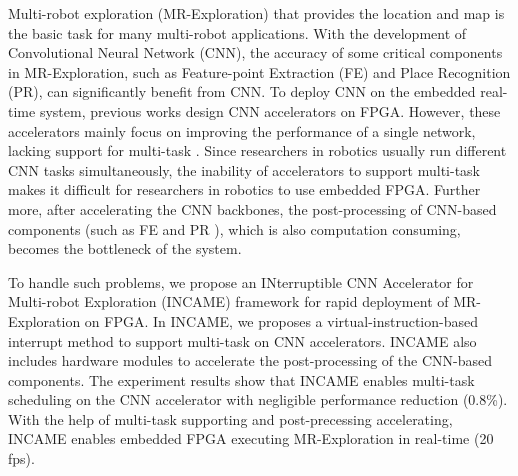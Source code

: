 Multi-robot exploration (MR-Exploration) that provides the location and map is the basic task for many multi-robot applications. 
With the development of Convolutional Neural Network (CNN), the accuracy of some critical components in MR-Exploration, such as Feature-point Extraction (FE) and Place Recognition (PR), can significantly benefit from CNN. 
To deploy CNN on the embedded real-time system, previous works design CNN accelerators on FPGA. 
However, these accelerators mainly focus on improving the performance of a single network, lacking support for multi-task .
Since researchers in robotics usually run different CNN tasks simultaneously, the inability of accelerators to support multi-task makes it difficult for researchers in robotics to use embedded FPGA.
Further more, after accelerating the CNN backbones, the post-processing of  CNN-based components (such as FE and PR ), which is also computation consuming, becomes the bottleneck of the system.

To handle such problems, we propose an INterruptible CNN Accelerator for Multi-robot Exploration (INCAME) framework for rapid deployment of MR-Exploration on FPGA.
In INCAME, we proposes a virtual-instruction-based interrupt method to support multi-task on CNN accelerators.
INCAME also includes hardware modules to accelerate the post-processing of the CNN-based components.
The experiment results show that INCAME enables multi-task scheduling on the CNN accelerator with negligible performance reduction (0.8\%). With the help of multi-task supporting and post-precessing accelerating, INCAME enables embedded FPGA executing MR-Exploration in real-time (20 fps).

